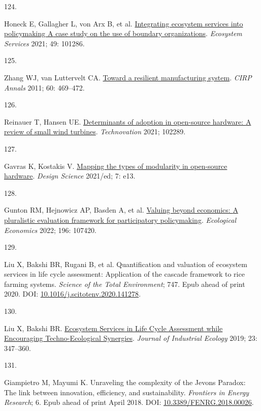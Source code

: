 \documentclass[
  12pt,
  a4paperpaper,
  onecolumn]{article}
\newlength{\cslhangindent}
\newlength{\csllabelwidth}
\newlength{\cslentryspacingunit} %
\newenvironment{CSLReferences}[2] %
 {%
  \setlength{\parindent}{0pt}
  \ifodd #1
  \let\oldpar\par
  \def\par{\hangindent=\cslhangindent\oldpar}
  \fi
  \setlength{\parskip}{#2\cslentryspacingunit}
 }%
 {}
\newcommand{\CSLLeftMargin}[1]{\parbox[t]{\csllabelwidth}{#1}}
\newcommand{\CSLRightInline}[1]{\parbox[t]{\linewidth - \csllabelwidth}{#1}\break}
\begin{document}
\begin{CSLReferences}{0}{0}
\leavevmode{}%
\CSLLeftMargin{124. }%
\CSLRightInline{Honeck E, Gallagher L, von Arx B, et al.
\href{https://doi.org/10.1016/j.ecoser.2021.101286}{Integrating
ecosystem services into policymaking \textendash{} {A} case study on the
use of boundary organizations}. \emph{Ecosystem Services} 2021; 49:
101286.}

\leavevmode{}%
\CSLLeftMargin{125. }%
\CSLRightInline{Zhang WJ, van Luttervelt CA.
\href{https://doi.org/10.1016/j.cirp.2011.03.041}{Toward a resilient
manufacturing system}. \emph{CIRP Annals} 2011; 60: 469--472.}

\leavevmode{}%
\CSLLeftMargin{126. }%
\CSLRightInline{Reinauer T, Hansen UE.
\href{https://doi.org/10.1016/j.technovation.2021.102289}{Determinants
of adoption in open-source hardware: {A} review of small wind turbines}.
\emph{Technovation} 2021; 102289.}

\leavevmode{}%
\CSLLeftMargin{127. }%
\CSLRightInline{Gavras K, Kostakis V.
\href{https://doi.org/10.1017/dsj.2021.11}{Mapping the types of
modularity in open-source hardware}. \emph{Design Science} 2021/ed; 7:
e13.}

\leavevmode{}%
\CSLLeftMargin{128. }%
\CSLRightInline{Gunton RM, Hejnowicz AP, Basden A, et al.
\href{https://doi.org/10.1016/j.ecolecon.2022.107420}{Valuing beyond
economics: {A} pluralistic evaluation framework for participatory
policymaking}. \emph{Ecological Economics} 2022; 196: 107420.}

\leavevmode{}%
\CSLLeftMargin{129. }%
\CSLRightInline{Liu X, Bakshi BR, Rugani B, et al. Quantification and
valuation of ecosystem services in life cycle assessment: {Application}
of the cascade framework to rice farming systems. \emph{Science of the
Total Environment}; 747. Epub ahead of print 2020. DOI:
\href{https://doi.org/10.1016/j.scitotenv.2020.141278}{10.1016/j.scitotenv.2020.141278}.}

\leavevmode{}%
\CSLLeftMargin{130. }%
\CSLRightInline{Liu X, Bakshi BR.
\href{https://doi.org/10.1111/jiec.12755}{Ecosystem {Services} in {Life
Cycle Assessment} while {Encouraging Techno}-{Ecological Synergies}}.
\emph{Journal of Industrial Ecology} 2019; 23: 347--360.}

\leavevmode{}%
\CSLLeftMargin{131. }%
\CSLRightInline{Giampietro M, Mayumi K. Unraveling the complexity of the
{Jevons Paradox}: {The} link between innovation, efficiency, and
sustainability. \emph{Frontiers in Energy Research}; 6. Epub ahead of
print April 2018. DOI:
\href{https://doi.org/10.3389/FENRG.2018.00026}{10.3389/FENRG.2018.00026}.}


\end{CSLReferences}
\end{document}
